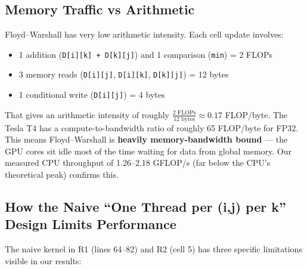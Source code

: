 \documentclass[11pt]{article}
\begin{document}
\subsection{Memory Traffic vs Arithmetic}

Floyd--Warshall has very low arithmetic intensity. Each cell update involves:
\begin{itemize}
  \item 1 addition (\texttt{D[i][k] + D[k][j]}) and 1 comparison (\texttt{min}) = 2 FLOPs
  \item 3 memory reads (\texttt{D[i][j]}, \texttt{D[i][k]}, \texttt{D[k][j]}) = 12 bytes
  \item 1 conditional write (\texttt{D[i][j]}) = 4 bytes
\end{itemize}

That gives an arithmetic intensity of roughly $\frac{2 \text{ FLOPs}}{12 \text{ bytes}} \approx 0.17$ FLOP/byte. The Tesla T4 has a compute-to-bandwidth ratio of roughly 65 FLOP/byte for FP32. This means Floyd--Warshall is \textbf{heavily memory-bandwidth bound} --- the GPU cores sit idle most of the time waiting for data from global memory. Our measured CPU throughput of 1.26--2.18 GFLOP/s (far below the CPU's theoretical peak) confirms this.

\subsection{How the Naive ``One Thread per (i,j) per k'' Design Limits Performance}

The naive kernel in R1 (lines 64--82) and R2 (cell 5) has three specific limitations visible in our results:
\end{document}
